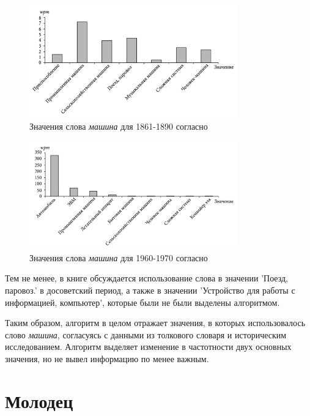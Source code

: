\noindent %
\begin{figure}[H]
    \centering %
    \includegraphics[width=0.8\textwidth]{img/book/mashina/1861-1890}
    \caption{Значения слова \textit{машина} для 1861-1890 согласно~\cite{TwoCenturies}}
    \label{fig:TwoCenturiesMashina1}
\end{figure}

\begin{figure}[H]
    \centering %
    \includegraphics[width=0.8\textwidth]{img/book/mashina/1960-1970}
    \caption{Значения слова \textit{машина} для 1960-1970 согласно~\cite{TwoCenturies}}
    \label{fig:TwoCenturiesMashina2}
\end{figure}

Тем не менее, в книге обсуждается использование слова в значении ’Поезд, паровоз.’
в досоветский период, а также в значении ’Устройство для работы с информацией, компьютер’,
которые были не были выделены алгоритмом.

Таким образом, алгоритм в целом отражает значения, в которых использовалось
слово \textit{машина}, согласуясь с данными из толкового словаря и историческим исследованием.
Алгоритм выделяет изменение в частотности двух основных значения, но не вывел информацию по менее важным.

\section*{Молодец}

